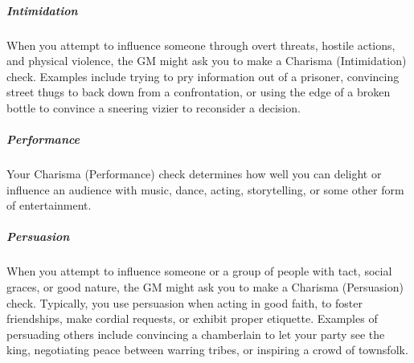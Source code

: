 \subparagraph*{Intimidation} When you attempt to influence someone through overt threats, hostile actions, and physical violence, the GM might ask you to make a Charisma (Intimidation) check. Examples include trying to pry information out of a prisoner, convincing street thugs to back down from a confrontation, or using the edge of a broken bottle to convince a sneering vizier to reconsider a decision.

\subparagraph*{Performance} Your Charisma (Performance) check determines how well you can delight or influence an audience with music, dance, acting, storytelling, or some other form of entertainment.

\subparagraph*{Persuasion} When you attempt to influence someone or a group of people with tact, social graces, or good nature, the GM might ask you to make a Charisma (Persuasion) check. Typically, you use persuasion when acting in good faith, to foster friendships, make cordial requests, or exhibit proper etiquette. Examples of persuading others include convincing a chamberlain to let your party see the king, negotiating peace between warring tribes, or inspiring a crowd of townsfolk.

